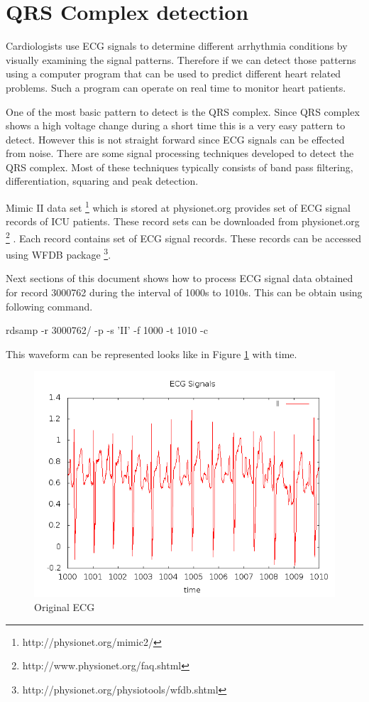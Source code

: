 \section{QRS Complex detection}
Cardiologists use ECG signals to determine different arrhythmia conditions by visually examining the signal patterns. Therefore if we can detect those patterns using a computer program that can be used to predict different heart related problems. Such a program can operate on real time to monitor heart patients.  
 
One of the most basic pattern to detect is the QRS complex. Since QRS complex shows a high voltage change during a short time this is a very easy pattern to detect. However this is not straight forward since ECG signals can be effected from noise. There are some signal processing techniques \cite{pan1985real} developed to detect the QRS complex.  Most of these techniques typically consists of band pass filtering, differentiation, squaring and peak detection.

Mimic II data set \footnote{http://physionet.org/mimic2/} which is stored at physionet.org provides set of ECG signal records of ICU patients. These record sets can be downloaded from  physionet.org \footnote{http://www.physionet.org/faq.shtml} . Each record contains set of ECG signal records. These records can be accessed using WFDB package \footnote{http://physionet.org/physiotools/wfdb.shtml}. 

Next sections of this document shows how to process ECG signal data obtained for record 3000762 during the interval of 1000s to 1010s. This can be obtain using following command.

rdsamp -r 3000762/ -p -s 'II' -f 1000 -t 1010 -c 

This waveform can be represented looks like in Figure \ref{ecg_original} with time.

\begin{figure}
        \centering
        \includegraphics[width=\textwidth]{ecg_original.png}
        \caption{Original ECG}
        \label{ecg_original}
\end{figure}
